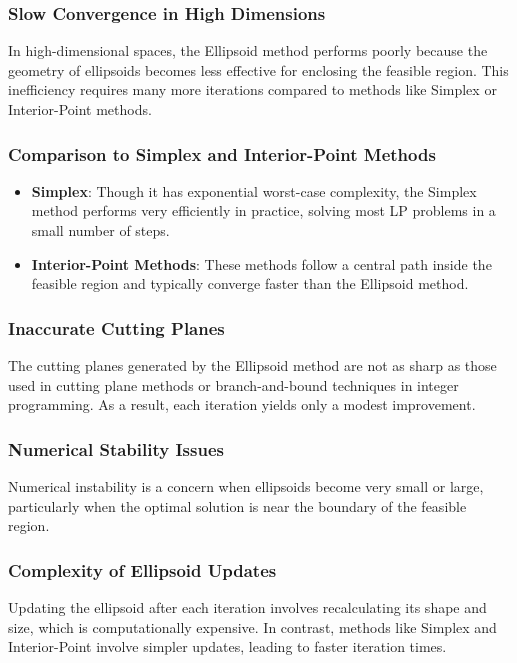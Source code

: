 \documentclass{article}
\begin{document}
\subsubsection{Slow Convergence in High Dimensions}
In high-dimensional spaces, the Ellipsoid method performs poorly because the geometry of ellipsoids becomes less effective for enclosing the feasible region. This inefficiency requires many more iterations compared to methods like Simplex or Interior-Point methods.

\subsubsection{Comparison to Simplex and Interior-Point Methods}
\begin{itemize}
    \item \textbf{Simplex}: Though it has exponential worst-case complexity, the Simplex method performs very efficiently in practice, solving most LP problems in a small number of steps.
    \item \textbf{Interior-Point Methods}: These methods follow a central path inside the feasible region and typically converge faster than the Ellipsoid method.
\end{itemize}

\subsubsection{Inaccurate Cutting Planes}
The cutting planes generated by the Ellipsoid method are not as sharp as those used in cutting plane methods or branch-and-bound techniques in integer programming. As a result, each iteration yields only a modest improvement.

\subsubsection{Numerical Stability Issues}
Numerical instability is a concern when ellipsoids become very small or large, particularly when the optimal solution is near the boundary of the feasible region.

\subsubsection{Complexity of Ellipsoid Updates}
Updating the ellipsoid after each iteration involves recalculating its shape and size, which is computationally expensive. In contrast, methods like Simplex and Interior-Point involve simpler updates, leading to faster iteration times.
\end{document}
